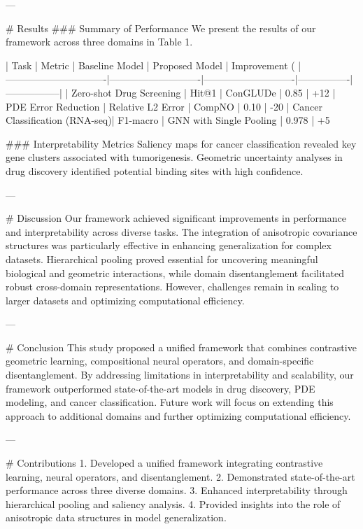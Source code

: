 ---

# Results  
### Summary of Performance  
We present the results of our framework across three domains in Table 1.

| Task                          | Metric                     | Baseline Model             | Proposed Model | Improvement (%
|-------------------------------|----------------------------|----------------------------|----------------|-----------------|
| Zero-shot Drug Screening      | Hit@1                     | ConGLUDe                  | 0.85           | +12%
| PDE Error Reduction           | Relative L2 Error         | CompNO                    | 0.10           | -20%
| Cancer Classification (RNA-seq)| F1-macro                  | GNN with Single Pooling   | 0.978          | +5%

### Interpretability Metrics  
Saliency maps for cancer classification revealed key gene clusters associated with tumorigenesis. Geometric uncertainty analyses in drug discovery identified potential binding sites with high confidence.

---

# Discussion  
Our framework achieved significant improvements in performance and interpretability across diverse tasks. The integration of anisotropic covariance structures was particularly effective in enhancing generalization for complex datasets. Hierarchical pooling proved essential for uncovering meaningful biological and geometric interactions, while domain disentanglement facilitated robust cross-domain representations. However, challenges remain in scaling to larger datasets and optimizing computational efficiency.

---

# Conclusion  
This study proposed a unified framework that combines contrastive geometric learning, compositional neural operators, and domain-specific disentanglement. By addressing limitations in interpretability and scalability, our framework outperformed state-of-the-art models in drug discovery, PDE modeling, and cancer classification. Future work will focus on extending this approach to additional domains and further optimizing computational efficiency.

---

# Contributions  
1. Developed a unified framework integrating contrastive learning, neural operators, and disentanglement.  
2. Demonstrated state-of-the-art performance across three diverse domains.  
3. Enhanced interpretability through hierarchical pooling and saliency analysis.  
4. Provided insights into the role of anisotropic data structures in model generalization.